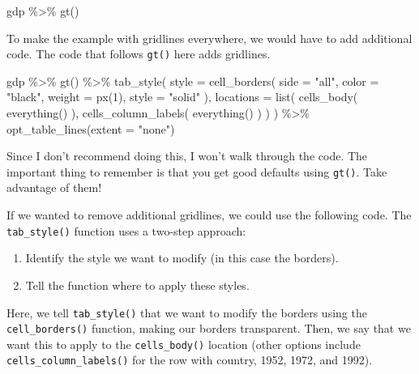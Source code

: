 \documentclass[
]{book}
\newenvironment{Shaded}{\begin{snugshade}}{\end{snugshade}}
\newcommand{\AttributeTok}[1]{\textcolor[rgb]{0.77,0.63,0.00}{#1}}
\newcommand{\DecValTok}[1]{\textcolor[rgb]{0.00,0.00,0.81}{#1}}
\newcommand{\FunctionTok}[1]{\textcolor[rgb]{0.00,0.00,0.00}{#1}}
\newcommand{\NormalTok}[1]{#1}
\newcommand{\SpecialCharTok}[1]{\textcolor[rgb]{0.00,0.00,0.00}{#1}}
\newcommand{\StringTok}[1]{\textcolor[rgb]{0.31,0.60,0.02}{#1}}
\providecommand{\tightlist}{%
  \setlength{\itemsep}{0pt}\setlength{\parskip}{0pt}}
\begin{document}
\begin{Shaded}
\begin{Highlighting}[]
\NormalTok{gdp }\SpecialCharTok{\%\textgreater{}\%} 
  \FunctionTok{gt}\NormalTok{()}
\end{Highlighting}
\end{Shaded}

To make the example with gridlines everywhere, we would have to add additional code. The code that follows \texttt{gt()} here adds gridlines.

\begin{Shaded}
\begin{Highlighting}[]
\NormalTok{gdp }\SpecialCharTok{\%\textgreater{}\%} 
  \FunctionTok{gt}\NormalTok{() }\SpecialCharTok{\%\textgreater{}\%} 
  \FunctionTok{tab\_style}\NormalTok{(}
    \AttributeTok{style =} \FunctionTok{cell\_borders}\NormalTok{(}
      \AttributeTok{side =} \StringTok{"all"}\NormalTok{,}
      \AttributeTok{color =} \StringTok{"black"}\NormalTok{,}
      \AttributeTok{weight =} \FunctionTok{px}\NormalTok{(}\DecValTok{1}\NormalTok{),}
      \AttributeTok{style =} \StringTok{"solid"}
\NormalTok{    ),}
    \AttributeTok{locations =} \FunctionTok{list}\NormalTok{(}
      \FunctionTok{cells\_body}\NormalTok{(}
        \FunctionTok{everything}\NormalTok{()}
\NormalTok{      ),}
      \FunctionTok{cells\_column\_labels}\NormalTok{(}
        \FunctionTok{everything}\NormalTok{()}
\NormalTok{      )}
\NormalTok{    )}
\NormalTok{  ) }\SpecialCharTok{\%\textgreater{}\%} 
  \FunctionTok{opt\_table\_lines}\NormalTok{(}\AttributeTok{extent =} \StringTok{"none"}\NormalTok{)}
\end{Highlighting}
\end{Shaded}

Since I don't recommend doing this, I won't walk through the code. The important thing to remember is that you get good defaults using \texttt{gt()}. Take advantage of them!

If we wanted to remove additional gridlines, we could use the following code. The \texttt{tab\_style()} function uses a two-step approach:

\begin{enumerate}
\def\labelenumi{\arabic{enumi}.}
\tightlist
\item
  Identify the style we want to modify (in this case the borders).
\item
  Tell the function where to apply these styles.
\end{enumerate}

Here, we tell \texttt{tab\_style()} that we want to modify the borders using the \texttt{cell\_borders()} function, making our borders transparent. Then, we say that we want this to apply to the \texttt{cells\_body()} location (other options include \texttt{cells\_column\_labels()} for the row with country, 1952, 1972, and 1992).
\end{document}
